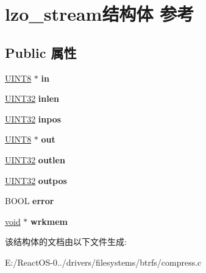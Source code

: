 \hypertarget{structlzo__stream}{}\section{lzo\+\_\+stream结构体 参考}
\label{structlzo__stream}
\subsection*{Public 属性}
\begin{DoxyCompactItemize}
\item 
\mbox{\label{structlzo__stream_a8e89fafbb61b90662aa9bf6dfcaa0a8f}} 
\hyperlink{_processor_bind_8h_ab27e9918b538ce9d8ca692479b375b6a}{U\+I\+N\+T8} $\ast$ {\bfseries in}
\item 
\mbox{\label{structlzo__stream_ab0c22e52df32975880922e9ddaa9db86}} 
\hyperlink{_processor_bind_8h_ae1e6edbbc26d6fbc71a90190d0266018}{U\+I\+N\+T32} {\bfseries inlen}
\item 
\mbox{\label{structlzo__stream_a6b09305b177d4ab90de7d96034ea65f9}} 
\hyperlink{_processor_bind_8h_ae1e6edbbc26d6fbc71a90190d0266018}{U\+I\+N\+T32} {\bfseries inpos}
\item 
\mbox{\label{structlzo__stream_a045fd72394ea9eb55b204f7948fa6213}} 
\hyperlink{_processor_bind_8h_ab27e9918b538ce9d8ca692479b375b6a}{U\+I\+N\+T8} $\ast$ {\bfseries out}
\item 
\mbox{\label{structlzo__stream_aa922428d6a8a07f3cfc96840431a0c52}} 
\hyperlink{_processor_bind_8h_ae1e6edbbc26d6fbc71a90190d0266018}{U\+I\+N\+T32} {\bfseries outlen}
\item 
\mbox{\label{structlzo__stream_a90016b5e742b8a9bbb2ece4ce7c82b05}} 
\hyperlink{_processor_bind_8h_ae1e6edbbc26d6fbc71a90190d0266018}{U\+I\+N\+T32} {\bfseries outpos}
\item 
\mbox{\label{structlzo__stream_a0047fbeb812e498b3ac2b2b2c49f102b}} 
B\+O\+OL {\bfseries error}
\item 
\mbox{\label{structlzo__stream_a77462066905fcca82fb6b6645a623dea}} 
\hyperlink{interfacevoid}{void} $\ast$ {\bfseries wrkmem}
\end{DoxyCompactItemize}


该结构体的文档由以下文件生成\+:\begin{DoxyCompactItemize}
\item 
E\+:/\+React\+O\+S-\/0../drivers/filesystems/btrfs/compress.\+c\end{DoxyCompactItemize}
